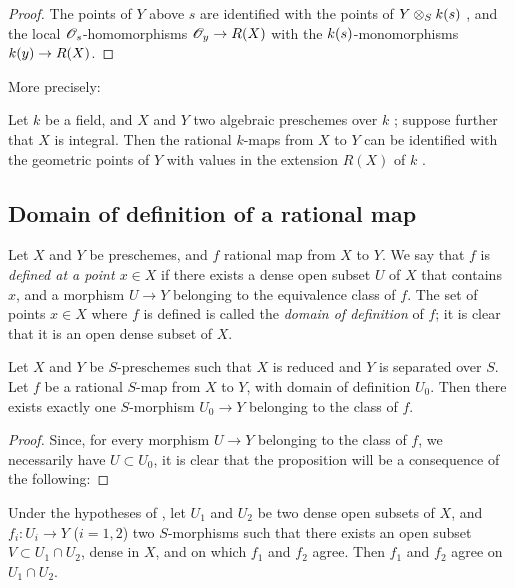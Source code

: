 \begin{proof}
\label{proof-1.7.1.15}
The points of $Y$ above $s$ are identified with the points of $Y\otimes_Sk(s)$ , and the local $\mathscr{O}_s$-homomorphisms $\OO_y\to R(X)$ with the $k(s)$-monomorphisms $\kres(y)\to R(X)$.
\end{proof}

More precisely:
\begin{cor}[7.1.16]
\label{1.7.1.16}
Let $k$ be a field, and $X$ and $Y$ two algebraic preschemes over $k$ ; suppose further that $X$ is integral.
Then the rational $k$-maps from $X$ to $Y$ can be identified with the geometric points of $Y$ with values in the extension $R(X)$ of $k$ .
\end{cor}

\subsection{Domain of definition of a rational map}
\label{subsection:domain-of-definition-of-a-rational-map}

\begin{env}[7.2.1]
\label{1.7.2.1}
Let $X$ and $Y$ be preschemes, and $f$ rational map from $X$ to $Y$.
We say that $f$ is \emph{defined at a point $x\in X$} if there exists a dense open subset $U$ of $X$ that contains $x$, and a morphism $U\to Y$ belonging to the equivalence class of $f$.
The set of points $x\in X$ where $f$ is defined is called the \emph{domain of definition} of $f$; it is clear that it is an open dense subset of $X$.
\end{env}

\begin{prop}[7.2.2]
\label{1.7.2.2}
Let
$X$ and $Y$ be $S$-preschemes such that $X$ is reduced and $Y$ is separated over $S$.
Let $f$ be a rational $S$-map from $X$ to $Y$, with domain of definition $U_0$.
Then there exists exactly one $S$-morphism $U_0\to Y$ belonging to the class of $f$.
\end{prop}

\begin{proof}
\label{proof-1.7.2.2}
Since, for every morphism $U\to Y$ belonging to the class of $f$, we necessarily have $U\subset U_0$, it is clear that the proposition will be a consequence of the following:
\end{proof}

\begin{lem}[7.2.2.1]
\label{1.7.2.2.1}
Under the hypotheses of , let $U_1$ and $U_2$ be two dense open subsets of $X$, and $f_i:U_i\to Y$ ($i=1,2$) two $S$-morphisms such that there exists an open subset $V\subset U_1\cap U_2$, dense in $X$, and on which $f_1$ and $f_2$ agree.
Then $f_1$ and $f_2$ agree on $U_1\cap U_2$.
\end{lem}

